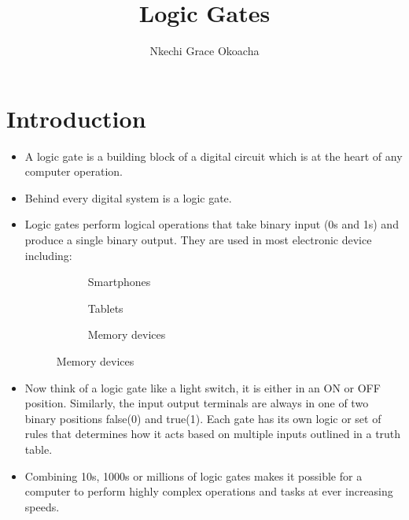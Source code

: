 \documentclass{article}
\begin{document}
	\title{Logic Gates}
	
	\author{Nkechi Grace Okoacha}
	
	\maketitle
	
\tableofcontents
	
\newpage

\section{Introduction}

\label{intro}
	\begin{itemize}
		\item A logic gate is a building block of a digital circuit which is at the heart of any computer operation. 
		\item Behind every digital system is a logic gate. 
		
		\item Logic gates perform logical operations that take binary input (0s and 1s) and produce  a single binary output. They are used in most electronic device including: \\
			\begin{figure}[h!]
				\centering
				\begin{subfigure}[b]{0.2\linewidth}
				\caption{Smartphones}
				\end{subfigure}
			\begin{subfigure}[b]{0.2\linewidth}
				\caption{Tablets}
			\end{subfigure}
		\begin{subfigure}[b]{0.2\linewidth}
			\caption{Memory devices}
		\end{subfigure}
			\end{figure} 
		
		\item Now think of a logic gate like a light switch, it is either in an ON or OFF position. Similarly, the input output terminals are always in one of two binary positions false(0) and true(1). Each gate has its own logic or set of rules that determines how it acts based on multiple inputs outlined in a truth table. 
		
		\item Combining 10s, 1000s or millions of logic gates makes it possible for a computer to perform highly complex operations and tasks at ever increasing speeds. 
		

\end{itemize}
\end{document}
